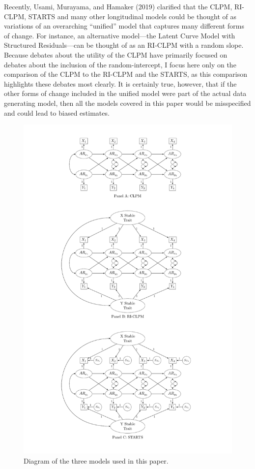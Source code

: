 \documentclass[
  english,
  man,floatsintext]{apa6}
\begin{document}
Recently, Usami, Murayama, and Hamaker (2019) clarified that the CLPM, RI-CLPM, STARTS and many other longitudinal models could be thought of as variations of an overarching ``unified'' model that captures many different forms of change. For instance, an alternative model---the Latent Curve Model with Structured Residuals---can be thought of as an RI-CLPM with a random slope. Because debates about the utility of the CLPM have primarily focused on debates about the inclusion of the random-intercept, I focus here only on the comparison of the CLPM to the RI-CLPM and the STARTS, as this comparison highlights these debates most clearly. It is certainly true, however, that if the other forms of change included in the unified model were part of the actual data generating model, then all the models covered in this paper would be misspecified and could lead to biased estimates.

\begin{figure}
\includegraphics[height=0.9\textheight]{images/comboFigure} \caption{Diagram of the three models used in this paper.}\label{fig:riclpmFig}
\end{figure}
\end{document}
